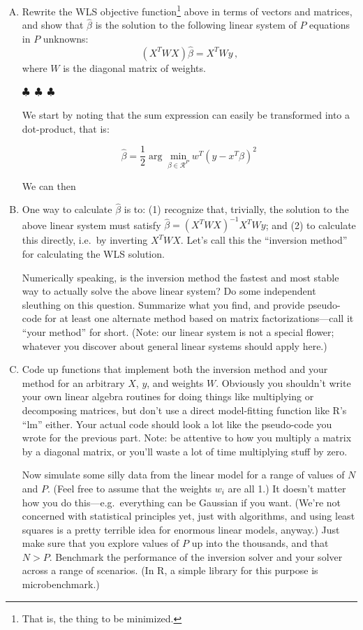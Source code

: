 \documentclass{mynotes}
\begin{document}
\begin{enumerate}[(A)]

\item Rewrite the WLS objective function\footnote{That is, the thing to be
minimized.} above in terms of vectors and matrices, and show that $\hat \beta$
is the solution to the following linear system of $P$ equations in $P$ unknowns:
$$
(X^T W X) \hat \beta = X^T W y \, ,
$$
where $W$ is the diagonal matrix of weights.

\begin{center}
  $\clubsuit$~$\clubsuit$~$\clubsuit$
\end{center}

We start by noting that the sum expression can easily be transformed into a
dot-product, that is:

\[
\hat{\beta} = \frac{1}{2} \arg \min_{\beta \in \mathcal{R}^P} w^T(y
- x^T \beta)^2 \,
\]

We can then 


\item One way to calculate $\hat{\beta}$ is to: (1) recognize that, trivially,
the solution to the above linear system must satisfy $\hat \beta = (X^T W
X)^{-1} X^T W y$; and (2) to calculate this directly, i.e.~by inverting $X^T W
X$. Let's call this the ``inversion method'' for calculating the WLS solution.

Numerically speaking, is the inversion method the fastest and most stable way to
actually solve the above linear system? Do some independent sleuthing on this
question. Summarize what you find, and provide pseudo-code for at least one
alternate method based on matrix factorizations---call it ``your method'' for
short. (Note: our linear system is not a special flower; whatever you discover
about general linear systems should apply here.)

\item Code up functions that implement both the inversion method and your method
for an arbitrary $X$, $y$, and weights $W$. Obviously you shouldn't write your
own linear algebra routines for doing things like multiplying or decomposing
matrices, but don't use a direct model-fitting function like R's ``lm'' either.
Your actual code should look a lot like the pseudo-code you wrote for the
previous part. Note: be attentive to how you multiply a matrix by a diagonal
matrix, or you'll waste a lot of time multiplying stuff by zero.

Now simulate some silly data from the linear model for a range of values of $N$
and $P$. (Feel free to assume that the weights $w_i$ are all 1.) It doesn't
matter how you do this---e.g.~everything can be Gaussian if you want. (We're not
concerned with statistical principles yet, just with algorithms, and using least
squares is a pretty terrible idea for enormous linear models, anyway.) Just make
sure that you explore values of $P$ up into the thousands, and that $N > P$.
Benchmark the performance of the inversion solver and your solver across a range
of scenarios. (In R, a simple library for this purpose is microbenchmark.)


\end{enumerate}
\end{document}
